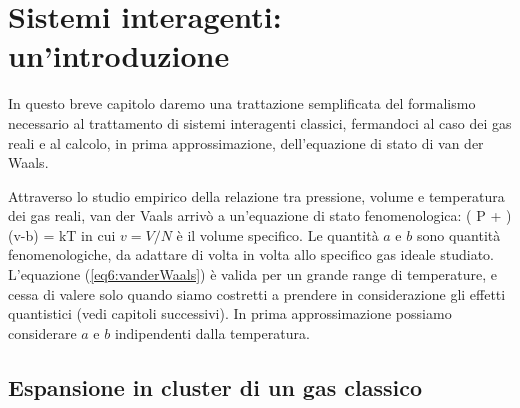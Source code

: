 \chapter{Sistemi interagenti: un'introduzione}
\label{cap:interagenti}

In questo breve capitolo daremo una trattazione semplificata del formalismo necessario al trattamento di sistemi interagenti classici, fermandoci al caso dei gas reali e al calcolo, in prima approssimazione, dell'equazione di stato di van der Waals.

Attraverso lo studio empirico della relazione tra pressione, volume e temperatura dei gas reali, van der Vaals arrivò a un'equazione di stato fenomenologica:
\be
\label{eq6:vanderWaals}
\left(
P + 
\right)(v-b) = kT
\ee
in cui $v = V/N$ è il volume specifico. Le quantità $a$ e $b$ sono quantità fenomenologiche, da adattare di volta in volta allo specifico gas ideale studiato. L'equazione (\ref{eq6:vanderWaals}) è valida per un grande range di temperature, e cessa di valere solo quando siamo costretti a prendere in considerazione gli effetti quantistici (vedi capitoli successivi). In prima approssimazione possiamo considerare $a$ e $b$ indipendenti dalla temperatura.

\section{Espansione in cluster di un gas classico}

